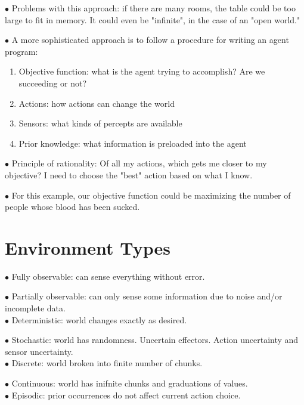 \documentclass[english,openany]{book}
\begin{document}
    $\bullet$ Problems with this approach: if there are many rooms, the table could be too large to fit in memory. It could even be "infinite", in the case of an "open world."
    
    $\bullet$ A more sophisticated approach is to follow a procedure for writing an agent program:
    
    \begin{enumerate}
        \item Objective function: what is the agent trying to accomplish? Are we succeeding or not?
        \item Actions: how actions can change the world
        \item Sensors: what kinds of percepts are available
        \item Prior knowledge: what information is preloaded into the agent
    \end{enumerate}
    
    $\bullet$ Principle of rationality: Of all my actions, which gets me closer to my objective? I need to choose the "best" action based on what I know.
    
    $\bullet$ For this example, our objective function could be maximizing the number of people whose blood has been sucked.
    
    
    \section{Environment Types}
    
    $\bullet$ Fully observable: can sense everything without error.
    
    $\bullet$ Partially observable: can only sense some information due to noise and/or incomplete data.\\
    
    $\bullet$ Deterministic: world changes exactly as desired.
    
    $\bullet$ Stochastic: world has randomness. Uncertain effectors. Action uncertainty and sensor uncertainty.\\
    
    $\bullet$ Discrete: world broken into finite number of chunks.
    
    $\bullet$ Continuous: world has inifnite chunks and graduations of values.\\
    
    $\bullet$ Episodic: prior occurrences do not affect current action choice.
    
\end{document}
